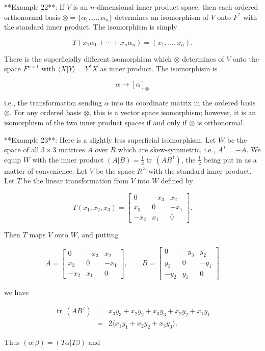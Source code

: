 

**Example 22**: If \(V\) is an \(n\)-dimensional inner product space, then each ordered orthonormal basis \(\otimes=\{\alpha_{1},\ldots,\alpha_{n}\}\) determines an isomorphism of \(V\) onto \(F^{*}\) with the standard inner product. The isomorphism is simply

\[T(x_{1}\alpha_{1}+\cdots+x_{n}\alpha_{n})=(x_{1},\ldots,x_{n}).\]

There is the superficially different isomorphism which \(\otimes\) determines of \(V\) onto the space \(F^{n\times 1}\) with \(\langle X|Y\rangle=Y^{*}X\) as inner product. The isomorphism is

\[\alpha\rightarrow[\alpha]_{\otimes}\]

i.e., the transformation sending \(\alpha\) into its coordinate matrix in the ordered basis \(\otimes\). For any ordered basis \(\otimes\), this is a vector space isomorphism; however, it is an isomorphism of the two inner product spaces if and only if \(\otimes\) is orthonormal.

**Example 23**: Here is a slightly less superficial isomorphism. Let \(W\) be the space of all \(3\times 3\) matrices \(A\) over \(R\) which are skew-symmetric, i.e., \(A^{\,t}=-A\). We equip \(W\) with the inner product \((A|B)=\frac{1}{2}\operatorname{tr}\,(AB^{\,t})\), the \(\frac{1}{2}\) being put in as a matter of convenience. Let \(V\) be the space \(R^{\,3}\) with the standard inner product. Let \(T\) be the linear transformation from \(V\) into \(W\) defined by

\[T(x_{1},x_{2},x_{3})=\left[\begin{array}{ccc}0&-x_{3}&x_{2}\\ x_{3}&0&-x_{1}\\ -x_{2}&x_{1}&0\end{array}\right].\]

Then \(T\) maps \(V\) onto \(W\), and putting

\[A=\left[\begin{array}{ccc}0&-x_{3}&x_{2}\\ x_{3}&0&-x_{1}\\ -x_{2}&x_{1}&0\end{array}\right],\qquad B=\left[\begin{array}{ccc}0&-y_{3}& y_{2}\\ y_{3}&0&-y_{1}\\ -y_{2}&y_{1}&0\end{array}\right]\]

we have

\[\begin{array}{rl}\operatorname{tr}\,(AB^{\,t})&=&x_{3}y_{3}+x_{2}y_{2}+x_{3 }y_{3}+x_{2}y_{2}+x_{1}y_{1}\\ &=&2\langle x_{1}y_{1}+x_{2}y_{2}+x_{3}y_{3}\rangle.\end{array}\]

Thus \((\alpha|\beta)=(T\alpha|T\beta)\) and
